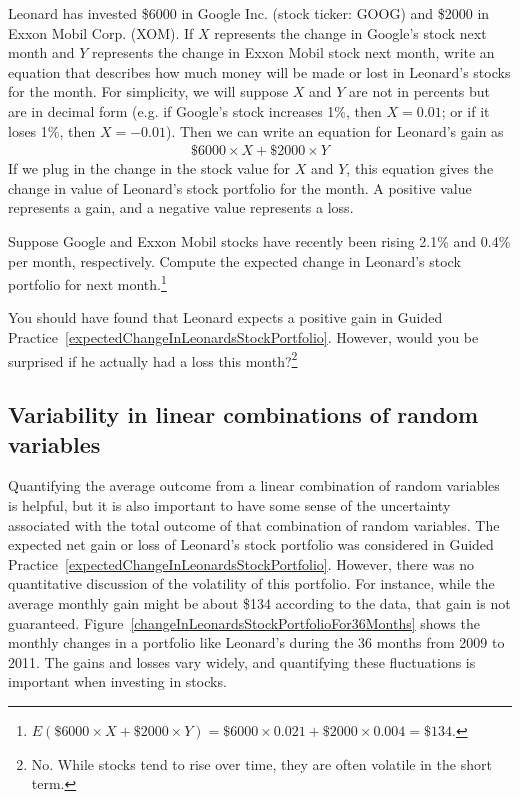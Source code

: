 \begin{example}{Leonard has invested \$6000 in Google Inc. (stock ticker: GOOG) and \$2000 in Exxon Mobil Corp. (XOM). If $X$ represents the change in Google's stock next month and $Y$ represents the change in Exxon Mobil stock next month, write an equation that describes how much money will be made or lost in Leonard's stocks for the month.}
For simplicity, we will suppose $X$ and $Y$ are not in percents but are in decimal form (e.g. if Google's stock increases 1\%, then $X=0.01$; or if it loses 1\%, then $X=-0.01$). Then we can write an equation for Leonard's gain as
\begin{align*}
\$6000\times X + \$2000\times Y
\end{align*}
If we plug in the change in the stock value for $X$ and $Y$, this equation gives the change in value of Leonard's stock portfolio for the month. A positive value represents a gain, and a negative value represents a loss.
\end{example}

\begin{exercise}\label{expectedChangeInLeonardsStockPortfolio}
Suppose Google and Exxon Mobil stocks have recently been rising 2.1\% and 0.4\% per month, respectively. Compute the expected change in Leonard's stock portfolio for next month.\footnote{$E(\$6000\times X + \$2000\times Y) = \$6000\times 0.021 + \$2000\times 0.004 = \$134$.}
\end{exercise}

\begin{exercise}
You should have found that Leonard expects a positive gain in Guided Practice~\ref{expectedChangeInLeonardsStockPortfolio}. However, would you be surprised if he actually had a loss this month?\footnote{No. While stocks tend to rise over time, they are often volatile in the short term.}
\end{exercise}

\subsection{Variability in linear combinations of random variables}

Quantifying the average outcome from a linear combination of random variables is helpful, but it is also important to have some sense of the uncertainty associated with the total outcome of that combination of random variables. The expected net gain or loss of Leonard's stock portfolio was considered in Guided Practice~\ref{expectedChangeInLeonardsStockPortfolio}. However, there was no quantitative discussion of the volatility of this portfolio. For instance, while the average monthly gain might be about \$134 according to the data, that gain is not guaranteed. Figure~\ref{changeInLeonardsStockPortfolioFor36Months} shows the monthly changes in a portfolio like Leonard's during the 36 months from 2009 to 2011. The gains and losses vary widely, and quantifying these fluctuations is important when investing in stocks.

